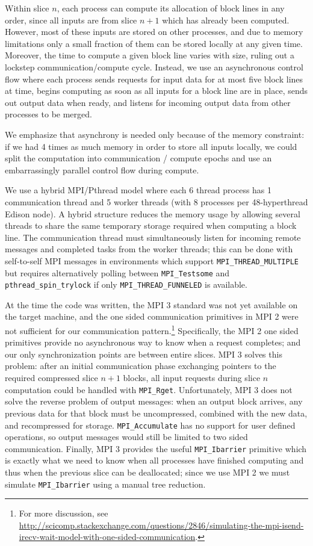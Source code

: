 \documentclass[conference]{IEEEtran}
\begin{document}
Within slice $n$, each process can compute its allocation of block lines in any order, since all inputs
are from slice $n+1$ which has already been computed.  However, most of these inputs are stored on other
processes, and due to memory limitations only a small fraction of them can be stored locally at any given time.
Moreover, the time to compute a given block line varies with size, ruling out a lockstep
communication/compute cycle.  Instead, we use an asynchronous control flow where each process sends
requests for input data for at most five block lines at time, begins computing as soon as all inputs for a
block line are in place, sends out output data when ready, and listens for incoming output data from other
processes to be merged.

We emphasize that asynchrony is needed only because of the memory constraint: if we had 4 times as much memory
in order to store all inputs locally, we could split the computation into communication / compute epochs and
use an embarrassingly parallel control flow during compute.

We use a hybrid MPI/Pthread model where each 6 thread process has 1 communication thread and 5 worker threads
(with 8 processes per 48-hyperthread Edison node).
A hybrid structure reduces the memory usage by allowing several threads to share the same temporary storage
required when computing a block line.  The communication thread must simultaneously listen for
incoming remote messages and completed tasks from the worker threads; this can be done with self-to-self MPI
messages in environments which support \verb+MPI_THREAD_MULTIPLE+ but requires alternatively polling between
\verb+MPI_Testsome+ and \verb+pthread_spin_trylock+ if only \verb+MPI_THREAD_FUNNELED+ is available.

At the time the code was written, the MPI 3 standard was not yet available on the target machine, and the
one sided communication primitives in MPI 2 were not sufficient for our communication
pattern.\footnote{For more discussion, see \url{http://scicomp.stackexchange.com/questions/2846/simulating-the-mpi-isend-irecv-wait-model-with-one-sided-communication}.}
Specifically, the MPI 2 one sided primitives provide no asynchronous way to know when a request completes; and
our only synchronization points are between entire slices.  MPI 3 solves this problem:
after an initial communication phase exchanging pointers to the required compressed slice $n+1$ blocks, all
input requests during slice $n$ computation could be handled with \verb+MPI_Rget+\cite{mpi-3:2012}.
Unfortunately, MPI 3 does
not solve the reverse problem of output messages: when an output block arrives, any previous data for that
block must be uncompressed, combined with the new data, and recompressed for storage.  \verb+MPI_Accumulate+ has
no support for user defined operations, so output messages would still be limited to two sided communication.
Finally, MPI 3 provides the useful \verb+MPI_Ibarrier+ primitive which is exactly what we need to know when
all processes have finished computing and thus when the previous slice can be deallocated; since we use MPI 2
we must simulate \verb+MPI_Ibarrier+ using a manual tree reduction.
\end{document}
